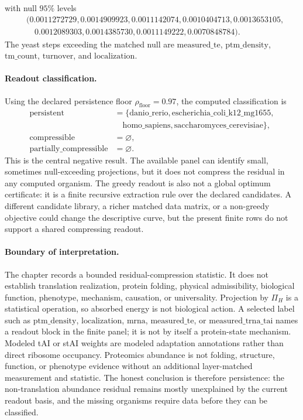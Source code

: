 with null $95\%$ levels
$$
\begin{aligned}
&(0.0011272729,0.0014909923,0.0011142074,0.0010404713,0.0013653105,\\
&\quad 0.0012089303,0.0014385730,0.0011149222,0.0070848784).
\end{aligned}
$$
The yeast steps exceeding the matched null are $\mathrm{measured\_te}$, $\mathrm{ptm\_density}$, $\mathrm{tm\_count}$, $\mathrm{turnover}$, and $\mathrm{localization}$.

\paragraph{Readout classification.}
Using the declared persistence floor $\rho_{\mathrm{floor}}=0.97$, the computed classification is
$$
\begin{aligned}
\mathrm{persistent}
&=\{\mathrm{danio\_rerio},\mathrm{escherichia\_coli\_k12\_mg1655},\\
&\quad \mathrm{homo\_sapiens},\mathrm{saccharomyces\_cerevisiae}\},\\
\mathrm{compressible}&=\varnothing,\\
\mathrm{partially\_compressible}&=\varnothing.
\end{aligned}
$$
This is the central negative result.  The available panel can identify small, sometimes null-exceeding projections, but it does not compress the residual in any computed organism.  The greedy readout is also not a global optimum certificate: it is a finite recursive extraction rule over the declared candidates.  A different candidate library, a richer matched data matrix, or a non-greedy objective could change the descriptive curve, but the present finite rows do not support a shared compressing readout.

\paragraph{Boundary of interpretation.}
The chapter records a bounded residual-compression statistic.  It does not establish translation realization, protein folding, physical admissibility, biological function, phenotype, mechanism, causation, or universality.  Projection by $\Pi_H$ is a statistical operation, so absorbed energy is not biological action.  A selected label such as $\mathrm{ptm\_density}$, $\mathrm{localization}$, $\mathrm{mrna}$, $\mathrm{measured\_te}$, or $\mathrm{measured\_trna\_tai}$ names a readout block in the finite panel; it is not by itself a protein-state mechanism.  Modeled tAI or stAI weights are modeled adaptation annotations rather than direct ribosome occupancy.  Proteomics abundance is not folding, structure, function, or phenotype evidence without an additional layer-matched measurement and statistic.  The honest conclusion is therefore persistence: the non-translation abundance residual remains mostly unexplained by the current readout basis, and the missing organisms require data before they can be classified.
